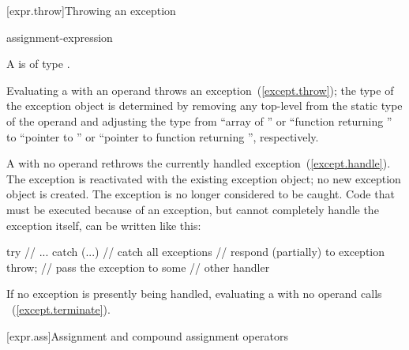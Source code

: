 [expr.throw]{Throwing an exception}%
%
%
%
%
\begin{bnf}
\br
      assignment-expression\opt
\end{bnf}

\pnum
A  is of type .

\pnum
Evaluating a  with an operand throws an
exception~(\ref{except.throw}); the type of the exception object is determined by removing
any top-level  from the static type of the
operand and adjusting the type from ``array of '' or ``function
returning '' to ``pointer to '' or ``pointer to function returning
'', respectively.

\pnum
{}%
A
with no operand rethrows the currently handled exception~(\ref{except.handle}).
The exception is reactivated with the existing exception object;
no new exception object is created.
The exception is no longer considered to be caught.
\enterexample
Code that must be executed because of an exception, but cannot
completely handle the exception itself, can be written like this:
\begin{codeblock}
try {
    // ...
} catch (...) {     // catch all exceptions
  // respond (partially) to exception
  throw;            // pass the exception to some
                    // other handler
}
\end{codeblock}
\exitexample

\pnum
{}%
%
%
If no exception is presently being handled,
evaluating a
with no operand calls
~(\ref{except.terminate}).

[expr.ass]{Assignment and compound assignment operators}%

